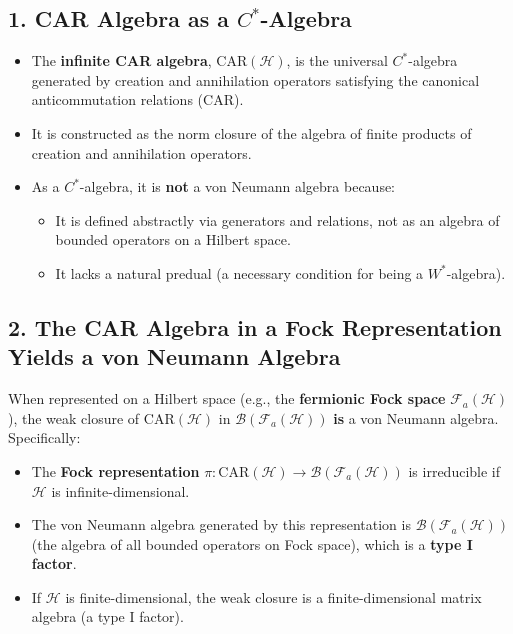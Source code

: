 \documentclass{article}
\begin{document}
\subsection*{1. CAR Algebra as a \( C^* \)-Algebra}
\begin{itemize}
    \item The \textbf{infinite CAR algebra}, \(\text{CAR}(\mathcal{H})\), is the universal \( C^* \)-algebra generated by creation and annihilation operators satisfying the canonical anticommutation relations (CAR).
    \item It is constructed as the norm closure of the algebra of finite products of creation and annihilation operators.
    \item As a \( C^* \)-algebra, it is \textbf{not} a von Neumann algebra because:
    \begin{itemize}
        \item It is defined abstractly via generators and relations, not as an algebra of bounded operators on a Hilbert space.
        \item It lacks a natural predual (a necessary condition for being a \( W^* \)-algebra).
    \end{itemize}
\end{itemize}

\subsection*{2. The CAR Algebra in a Fock Representation Yields a von Neumann Algebra}
When represented on a Hilbert space (e.g., the \textbf{fermionic Fock space} \(\mathcal{F}_a(\mathcal{H})\)), the weak closure of \(\text{CAR}(\mathcal{H})\) in \(\mathcal{B}(\mathcal{F}_a(\mathcal{H}))\) \textbf{is} a von Neumann algebra. Specifically:
\begin{itemize}
    \item The \textbf{Fock representation} \(\pi: \text{CAR}(\mathcal{H}) \to \mathcal{B}(\mathcal{F}_a(\mathcal{H}))\) is irreducible if \(\mathcal{H}\) is infinite-dimensional.
    \item The von Neumann algebra generated by this representation is \(\mathcal{B}(\mathcal{F}_a(\mathcal{H}))\) (the algebra of all bounded operators on Fock space), which is a \textbf{type I factor}.
    \item If \(\mathcal{H}\) is finite-dimensional, the weak closure is a finite-dimensional matrix algebra (a type I factor).
\end{itemize}
\end{document}
